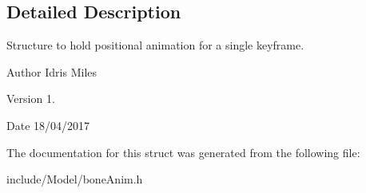 \subsection{Detailed Description}
Structure to hold positional animation for a single keyframe. 

\begin{DoxyAuthor}{Author}
Idris Miles 
\end{DoxyAuthor}
\begin{DoxyVersion}{Version}
1. 
\end{DoxyVersion}
\begin{DoxyDate}{Date}
18/04/2017 
\end{DoxyDate}


The documentation for this struct was generated from the following file\+:\begin{DoxyCompactItemize}
\item 
include/\+Model/bone\+Anim.\+h\end{DoxyCompactItemize}
